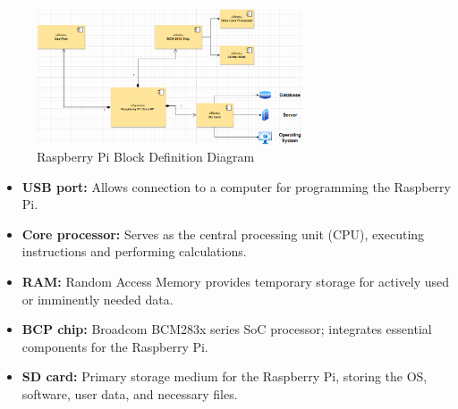 \documentclass[11pt]{article}
\begin{document}
	\begin{figure}[h]
		\centering
		\includegraphics[width=0.7\textwidth]{RPi.png}
		\caption{Raspberry Pi Block Definition Diagram}\label{fig:rpi-bdd}
	\end{figure}
	
	\begin{itemize}
		\item \textbf{USB port:} Allows connection to a computer for programming the Raspberry Pi.
		\item \textbf{Core processor:} Serves as the central processing unit (CPU), executing instructions and performing calculations.
		\item \textbf{RAM:} Random Access Memory provides temporary storage for actively used or imminently needed data.
		\item \textbf{BCP chip:} Broadcom BCM283x series SoC processor; integrates essential components for the Raspberry Pi.
		\item \textbf{SD card:} Primary storage medium for the Raspberry Pi, storing the OS, software, user data, and necessary files.
	\end{itemize}
\end{document}
